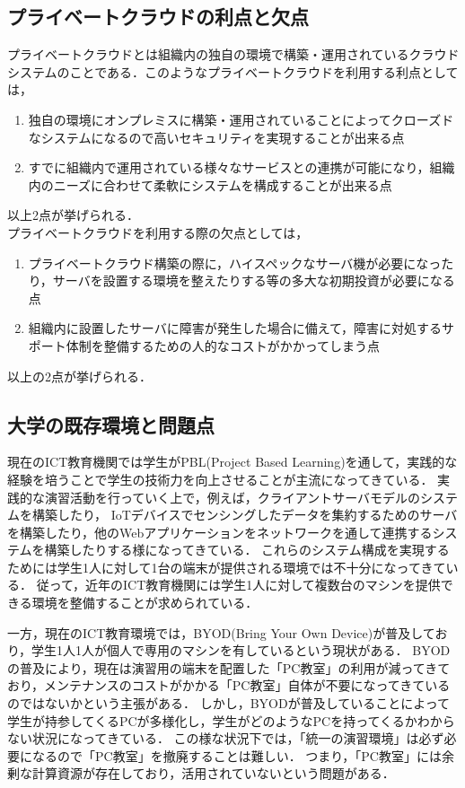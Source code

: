 \documentclass[11pt,a4]{jsarticle}
\begin{document}
\subsection{プライベートクラウドの利点と欠点}
プライベートクラウドとは組織内の独自の環境で構築・運用されているクラウドシステムのことである．このようなプライベートクラウドを利用する利点としては，
\begin{enumerate}
	\item 独自の環境にオンプレミスに構築・運用されていることによってクローズドなシステムになるので高いセキュリティを実現することが出来る点
	\item すでに組織内で運用されている様々なサービスとの連携が可能になり，組織内のニーズに合わせて柔軟にシステムを構成することが出来る点
\end{enumerate}
以上2点が挙げられる．\\
プライベートクラウドを利用する際の欠点としては，
\begin{enumerate}
	\item プライベートクラウド構築の際に，ハイスペックなサーバ機が必要になったり，サーバを設置する環境を整えたりする等の多大な初期投資が必要になる点
	\item 組織内に設置したサーバに障害が発生した場合に備えて，障害に対処するサポート体制を整備するための人的なコストがかかってしまう点
\end{enumerate}
以上の2点が挙げられる．

\subsection{大学の既存環境と問題点}
現在のICT教育機関では学生がPBL(Project Based Learning)を通して，実践的な経験を培うことで学生の技術力を向上させることが主流になってきている．
実践的な演習活動を行っていく上で，例えば，クライアントサーバモデルのシステムを構築したり，
IoTデバイスでセンシングしたデータを集約するためのサーバを構築したり，他のWebアプリケーションをネットワークを通して連携するシステムを構築したりする様になってきている．
これらのシステム構成を実現するためには学生1人に対して1台の端末が提供される環境では不十分になってきている．
従って，近年のICT教育機関には学生1人に対して複数台のマシンを提供できる環境を整備することが求められている．
\par 一方，現在のICT教育環境では，BYOD(Bring Your Own Device)が普及しており，学生1人1人が個人で専用のマシンを有しているという現状がある．
BYODの普及により，現在は演習用の端末を配置した「PC教室」の利用が減ってきており，メンテナンスのコストがかかる「PC教室」自体が不要になってきているのではないかという主張がある．
しかし，BYODが普及していることによって学生が持参してくるPCが多様化し，学生がどのようなPCを持ってくるかわからない状況になってきている．
この様な状況下では，「統一の演習環境」は必ず必要になるので「PC教室」を撤廃することは難しい．
つまり，「PC教室」には余剰な計算資源が存在しており，活用されていないという問題がある．
\end{document}
